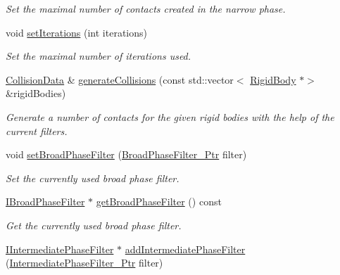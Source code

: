 \begin{DoxyCompactItemize}
\begin{DoxyCompactList}\small\item\em Set the maximal number of contacts created in the narrow phase. \end{DoxyCompactList}\item 
void \mbox{\hyperlink{classr3_1_1_collision_detector_a4d6081592ca35150cd6c8fe0d551c64d}{set\+Iterations}} (int iterations)
\begin{DoxyCompactList}\small\item\em Set the maximal number of iterations used. \end{DoxyCompactList}\item 
\mbox{\hyperlink{classr3_1_1_collision_data}{Collision\+Data}} \& \mbox{\hyperlink{classr3_1_1_collision_detector_a58a1bd9705f241e4c137458bed35f596}{generate\+Collisions}} (const std\+::vector$<$ \mbox{\hyperlink{classr3_1_1_rigid_body}{Rigid\+Body}} $\ast$$>$ \&rigid\+Bodies)
\begin{DoxyCompactList}\small\item\em Generate a number of contacts for the given rigid bodies with the help of the current filters. \end{DoxyCompactList}\item 
void \mbox{\hyperlink{classr3_1_1_collision_detector_a2184ca2db73a6446cf028e3b742c7cc4}{set\+Broad\+Phase\+Filter}} (\mbox{\hyperlink{classr3_1_1_collision_detector_aa8ed51d53c6f6ce545c93ad0e356d6de}{Broad\+Phase\+Filter\+\_\+\+Ptr}} filter)
\begin{DoxyCompactList}\small\item\em Set the currently used broad phase filter. \end{DoxyCompactList}\item 
\mbox{\hyperlink{classr3_1_1_i_broad_phase_filter}{I\+Broad\+Phase\+Filter}} $\ast$ \mbox{\hyperlink{classr3_1_1_collision_detector_aa4d1c9560f806496b2215ddc623a1387}{get\+Broad\+Phase\+Filter}} () const
\begin{DoxyCompactList}\small\item\em Get the currently used broad phase filter. \end{DoxyCompactList}\item 
\mbox{\hyperlink{classr3_1_1_i_intermediate_phase_filter}{I\+Intermediate\+Phase\+Filter}} $\ast$ \mbox{\hyperlink{classr3_1_1_collision_detector_a804d66d43502a2b113aa1e8c302cebc7}{add\+Intermediate\+Phase\+Filter}} (\mbox{\hyperlink{classr3_1_1_collision_detector_a8337c2c23ec77350b65977e043c07827}{Intermediate\+Phase\+Filter\+\_\+\+Ptr}} filter)
$$
\end{DoxyCompactItemize}
